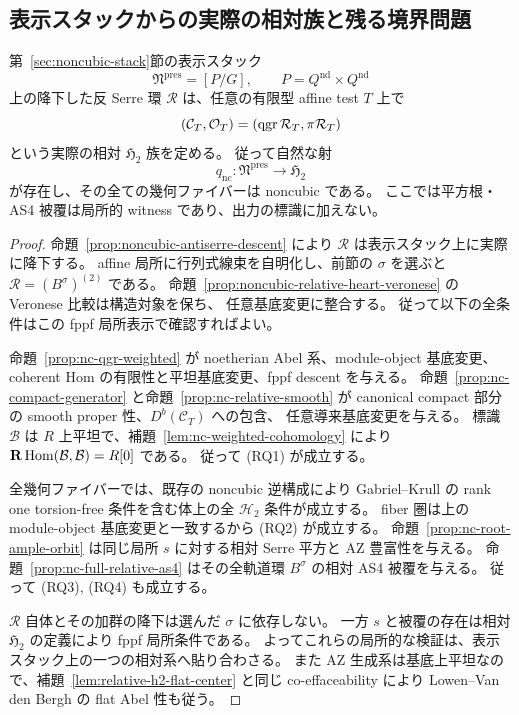 \subsection{表示スタックからの実際の相対族と残る境界問題}

\begin{theorem}\label{thm:noncubic-relative-effectivity}
第~\ref{sec:noncubic-stack}節の表示スタック
\[
 \mathfrak N^{\mathrm{pres}}=[P/G],\qquad
 P=Q^{\mathrm{nd}}\times Q^{\mathrm{nd}}
\]
上の降下した反 Serre 環 $\mathcal R$ は、任意の有限型 affine test $T$ 上で
\[
 (\mathcal C_T,\mathcal O_T)=(\operatorname{qgr}\mathcal R_T,\pi\mathcal R_T)
\]
という実際の相対 $\mathfrak H_2$ 族を定める。
従って自然な射
\[
 q_{\mathrm{nc}}:\mathfrak N^{\mathrm{pres}}\longrightarrow\mathfrak H_2
\]
が存在し、その全ての幾何ファイバーは noncubic である。
ここでは平方根・AS4 被覆は局所的 witness であり、出力の標識に加えない。
\end{theorem}

\begin{proof}
命題~\ref{prop:noncubic-antiserre-descent} により $\mathcal R$ は表示スタック上に実際に降下する。
affine 局所に行列式線束を自明化し、前節の $\sigma$ を選ぶと
$\mathcal R=(B^\sigma)^{(2)}$ である。
命題~\ref{prop:noncubic-relative-heart-veronese} の Veronese 比較は構造対象を保ち、
任意基底変更に整合する。
従って以下の全条件はこの fppf 局所表示で確認すればよい。

命題~\ref{prop:nc-qgr-weighted} が noetherian Abel 系、module-object 基底変更、
coherent Hom の有限性と平坦基底変更、fppf descent を与える。
命題~\ref{prop:nc-compact-generator} と命題~\ref{prop:nc-relative-smooth} が
canonical compact 部分の smooth proper 性、$D^b(\mathcal C_T)$ への包含、
任意導来基底変更を与える。
標識 $\mathcal B$ は $R$ 上平坦で、補題~\ref{lem:nc-weighted-cohomology} により
$\mathbf R\operatorname{Hom}(\mathcal B,\mathcal B)=R[0]$ である。
従って (RQ1) が成立する。

全幾何ファイバーでは、既存の noncubic 逆構成により Gabriel--Krull の
rank one torsion-free 条件を含む体上の全 $\mathcal H_2$ 条件が成立する。
fiber 圏は上の module-object 基底変更と一致するから (RQ2) が成立する。
命題~\ref{prop:nc-root-ample-orbit} は同じ局所 $s$ に対する相対 Serre 平方と AZ 豊富性を与える。
命題~\ref{prop:nc-full-relative-as4} はその全軌道環 $B^\sigma$ の相対 AS4 被覆を与える。
従って (RQ3), (RQ4) も成立する。

$\mathcal R$ 自体とその加群の降下は選んだ $\sigma$ に依存しない。
一方 $s$ と被覆の存在は相対 $\mathfrak H_2$ の定義により fppf 局所条件である。
よってこれらの局所的な検証は、表示スタック上の一つの相対系へ貼り合わさる。
また AZ 生成系は基底上平坦なので、補題~\ref{lem:relative-h2-flat-center} と同じ co-effaceability により
Lowen--Van den Bergh の flat Abel 性も従う。
\end{proof}

